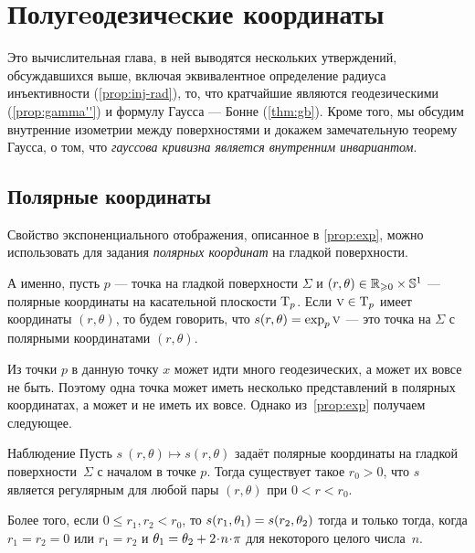 \chapter{Полугeодезичeские координаты}
\label{chap:semigeodesic}

Это вычислительная глава, в ней выводятся нескольких утверждений, обсуждавшихся выше, включая 
эквивалентное определение радиуса инъективности (\ref{prop:inj-rad}),
то, что кратчайшие являются геодезическими (\ref{prop:gamma''})
и формулу Гаусса --- Бонне (\ref{thm:gb}).
Кроме того, мы обсудим внутренние изометрии между поверхностями и докажем 
замечательную теорему Гаусса, о том, что \textit{гауссова кривизна является внутренним инвариантом}.

\section{Полярные координаты}\label{sec:Polar coordinates}

{\sloppy

Свойство экспоненциального отображения, описанное в \ref{prop:exp}, можно использовать для задания \emph{полярных координат} на гладкой поверхности.

}

А именно, пусть $p$ --- точка на гладкой поверхности $\Sigma$ и
$(r,\theta) \z\in \mathbb{R}_{\ge0} \times \mathbb{S}^1$ --- полярные координаты на касательной плоскости $\mathrm{T}_p$.
Если $\text{\sc{v}}\in \mathrm{T}_p$ имеет координаты $(r,\theta)$,
то будем говорить, что $s(r,\theta)\z=\exp_p\vec v$ --- это точка на $\Sigma$ с полярными координатами $(r,\theta)$.

Из точки $p$ в данную точку $x$ может идти много геодезических, а может их вовсе не быть.
Поэтому одна точка может иметь несколько представлений в полярных координатах, а может и не иметь их вовсе.
Однако из~\ref{prop:exp} получаем следующее.

\begin{thm}{Наблюдение}\label{obs:polar}
Пусть $s\:(r,\theta)\mapsto s(r,\theta)$ задаёт полярные координаты на гладкой поверхности~$\Sigma$ с началом в точке $p$.
Тогда существует такое $r_0>0$, что $s$ является регулярным для любой пары $(r,\theta)$ при $0<r<r_0$.

Более того, если $0\le r_1,r_2<r_0$, то $s(r_1,\theta_1) \z= s(r_2,\theta_2)$ тогда и только тогда, когда
$r_1=r_2=0$ или $r_1=r_2$ и $\theta_1\z=\theta_2+2\cdot n\cdot\pi$ для некоторого целого числа~$n$.
\end{thm}


